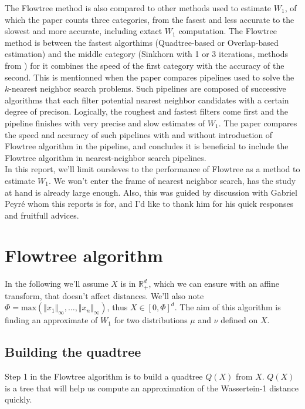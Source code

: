 \documentclass[11pt]{article}
\begin{document}
The Flowtree method is also compared to other methods used to estimate $W_1$, of which the paper counts three categories, from the fasest and less accurate to the slowest and more accurate, including extact $W_1$ computation. The Flowtree method is between the fastest algorthims (Quadtree-based or Overlap-based estimation) and the middle category (Sinkhorn with 1 or 3 iterations, methods from \cite{TwOW1approx}) for it combines the speed of the first category with the accuracy of the second.
This is mentionned when the paper compares pipelines used to solve the $k$-nearest neighbor search problems. Such pipelines are composed of successive algorithms that each filter potential nearest neighbor candidates with a certain degree of precison. Logically, the roughest and fastest filters come first and the pipeline finishes with very precise and slow estimates of $W_1$. The paper compares the speed and accuracy of such pipelines with and without introduction of Flowtree algorithm in the pipeline, and concludes it is beneficial to include the Flowtree algorithm in nearest-neighbor search pipelines.\\

In this report, we'll limit oursleves to the performance of Flowtree as a method to estimate $W_1$. We won't enter the frame of nearest neighbor search, has the study at hand is already large enough. Also, this was guided by discussion with Gabriel Peyré whom this reports is for, and I'd like to thank him for his quick responses and fruitfull advices.


\section{Flowtree algorithm}
In the following we'll assume $X$ is in $\mathbb{R}^d_+$, which we can ensure with an affine transform, that doesn't affect distances.  We'll also note $\Phi = \text{max}(\Vert x_1 \Vert_\infty, \dots, \Vert x_n \Vert_\infty)$, thus $X \in [0, \Phi]^d$. The aim of this algorithm is finding an approximate of $W_1$ for two distributions $\mu$ and $\nu$ defined on $X$.

\subsection{Building the quadtree}\label{ssec:building_the_quandtree}
Step 1 in the Flowtree algorithm is to build a quadtree $Q(X)$ from $X$. $Q(X)$ is a tree that will help us compute an approximation of the Wassertein-1 distance quickly.
\end{document}
